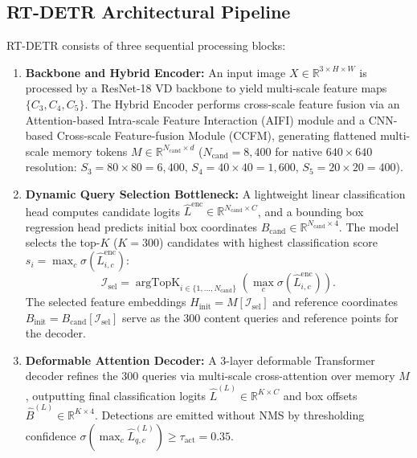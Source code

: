 \documentclass[preprint,12pt]{elsarticle}
\begin{document}
\subsection{RT-DETR Architectural Pipeline}
RT-DETR consists of three sequential processing blocks:
\begin{enumerate}
    \item \textbf{Backbone and Hybrid Encoder:} An input image $X \in \mathbb{R}^{3 \times H \times W}$ is processed by a ResNet-18 VD backbone to yield multi-scale feature maps $\{C_3, C_4, C_5\}$. The Hybrid Encoder performs cross-scale feature fusion via an Attention-based Intra-scale Feature Interaction (AIFI) module and a CNN-based Cross-scale Feature-fusion Module (CCFM), generating flattened multi-scale memory tokens $M \in \mathbb{R}^{N_{\mathrm{cand}} \times d}$ ($N_{\mathrm{cand}} = 8{,}400$ for native $640 \times 640$ resolution: $S_3 = 80\times 80 = 6{,}400$, $S_4 = 40\times 40 = 1{,}600$, $S_5 = 20\times 20 = 400$).
    \item \textbf{Dynamic Query Selection Bottleneck:} A lightweight linear classification head computes candidate logits $\hat{L}^{\mathrm{enc}} \in \mathbb{R}^{N_{\mathrm{cand}} \times C}$, and a bounding box regression head predicts initial box coordinates $B_{\mathrm{cand}} \in \mathbb{R}^{N_{\mathrm{cand}} \times 4}$. The model selects the top-$K$ ($K=300$) candidates with highest classification score $s_i = \max_c \sigma(\hat{L}_{i, c}^{\mathrm{enc}})$:
    \begin{equation}
        \mathcal{I}_{\mathrm{sel}} = \operatorname{argTopK}_{i \in \{1,\dots,N_{\mathrm{cand}}\}} \left( \max_c \sigma(\hat{L}_{i, c}^{\mathrm{enc}}) \right).
    \end{equation}
    The selected feature embeddings $H_{\mathrm{init}} = M[\mathcal{I}_{\mathrm{sel}}]$ and reference coordinates $B_{\mathrm{init}} = B_{\mathrm{cand}}[\mathcal{I}_{\mathrm{sel}}]$ serve as the 300 content queries and reference points for the decoder.
    \item \textbf{Deformable Attention Decoder:} A 3-layer deformable Transformer decoder refines the 300 queries via multi-scale cross-attention over memory $M$, outputting final classification logits $\hat{L}^{(L)} \in \mathbb{R}^{K \times C}$ and box offsets $\hat{B}^{(L)} \in \mathbb{R}^{K \times 4}$. Detections are emitted without NMS by thresholding confidence $\sigma(\max_c \hat{L}_{q, c}^{(L)}) \ge \tau_{\mathrm{act}} = 0.35$.
\end{enumerate}
\end{document}
